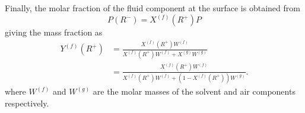 \documentclass[11pt,twoside]{report}
\begin{document}
Finally, the molar fraction of the fluid component at the surface is obtained from
\begin{equation}
  P(R^-) = X^{(f)}(R^+) P
\end{equation}
giving the mass fraction as
\begin{equation}
  \begin{aligned}
    Y^{(f)}(R^+) &=
    \frac{X^{(f)}(R^+) W^{(f)}}{X^{(f)}(R^+) W^{(f)} + X^{(g)} W^{(g)}} \\
    &=
    \frac{X^{(f)}(R^+) W^{(f)}}{X^{(f)}(R^+) W^{(f)} + (1 - X^{(f)}(R^+)) W^{(g)}}.
  \end{aligned}
\end{equation}
where $W^{(f)}$ and $W^{(g)}$ are the molar masses of the solvent and air components respectively.


\end{document}
